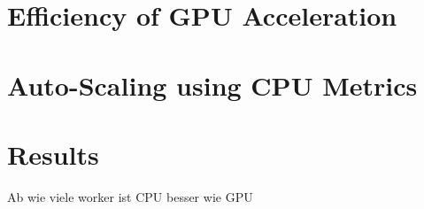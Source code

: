 \section{Efficiency of GPU Acceleration}


\section{Auto-Scaling using CPU Metrics}


\section{Results}
Ab wie viele worker ist CPU besser wie GPU
